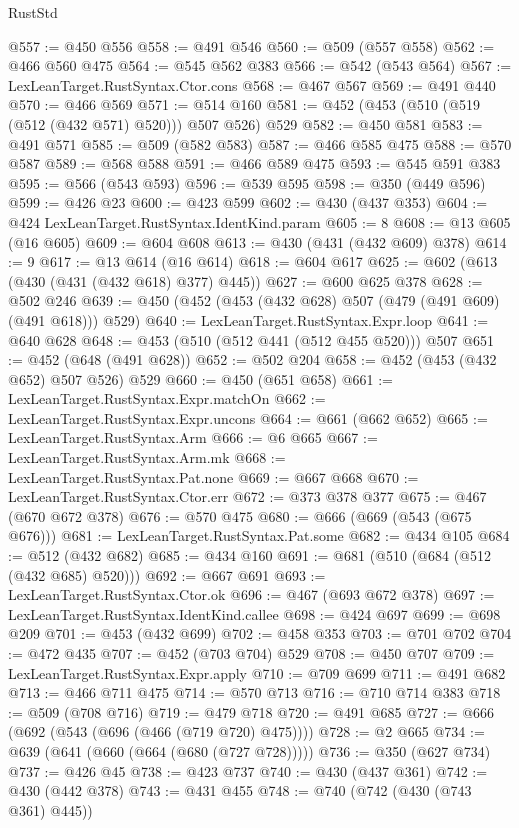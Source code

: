 \begin{lexlean}{RustStd}
\begin{coremodule}
@557 := @450 @556
@558 := @491 @546
@560 := @509 (@557 @558)
@562 := @466 @560 @475
@564 := @545 @562 @383
@566 := @542 (@543 @564)
@567 := LexLeanTarget.RustSyntax.Ctor.cons
@568 := @467 @567
@569 := @491 @440
@570 := @466 @569
@571 := @514 @160
@581 := @452 (@453 (@510 (@519 (@512 (@432 @571) @520))) @507 @526) @529
@582 := @450 @581
@583 := @491 @571
@585 := @509 (@582 @583)
@587 := @466 @585 @475
@588 := @570 @587
@589 := @568 @588
@591 := @466 @589 @475
@593 := @545 @591 @383
@595 := @566 (@543 @593)
@596 := @539 @595
@598 := @350 (@449 @596)
@599 := @426 @23
@600 := @423 @599
@602 := @430 (@437 @353)
@604 := @424 LexLeanTarget.RustSyntax.IdentKind.param
@605 := 8
@608 := @13 @605 (@16 @605)
@609 := @604 @608
@613 := @430 (@431 (@432 @609) @378)
@614 := 9
@617 := @13 @614 (@16 @614)
@618 := @604 @617
@625 := @602 (@613 (@430 (@431 (@432 @618) @377) @445))
@627 := @600 @625 @378
@628 := @502 @246
@639 := @450 (@452 (@453 (@432 @628) @507 (@479 (@491 @609) (@491 @618))) @529)
@640 := LexLeanTarget.RustSyntax.Expr.loop
@641 := @640 @628
@648 := @453 (@510 (@512 @441 (@512 @455 @520))) @507
@651 := @452 (@648 (@491 @628))
@652 := @502 @204
@658 := @452 (@453 (@432 @652) @507 @526) @529
@660 := @450 (@651 @658)
@661 := LexLeanTarget.RustSyntax.Expr.matchOn
@662 := LexLeanTarget.RustSyntax.Expr.uncons
@664 := @661 (@662 @652)
@665 := LexLeanTarget.RustSyntax.Arm
@666 := @6 @665
@667 := LexLeanTarget.RustSyntax.Arm.mk
@668 := LexLeanTarget.RustSyntax.Pat.none
@669 := @667 @668
@670 := LexLeanTarget.RustSyntax.Ctor.err
@672 := @373 @378 @377
@675 := @467 (@670 @672 @378)
@676 := @570 @475
@680 := @666 (@669 (@543 (@675 @676)))
@681 := LexLeanTarget.RustSyntax.Pat.some
@682 := @434 @105
@684 := @512 (@432 @682)
@685 := @434 @160
@691 := @681 (@510 (@684 (@512 (@432 @685) @520)))
@692 := @667 @691
@693 := LexLeanTarget.RustSyntax.Ctor.ok
@696 := @467 (@693 @672 @378)
@697 := LexLeanTarget.RustSyntax.IdentKind.callee
@698 := @424 @697
@699 := @698 @209
@701 := @453 (@432 @699)
@702 := @458 @353
@703 := @701 @702
@704 := @472 @435
@707 := @452 (@703 @704) @529
@708 := @450 @707
@709 := LexLeanTarget.RustSyntax.Expr.apply
@710 := @709 @699
@711 := @491 @682
@713 := @466 @711 @475
@714 := @570 @713
@716 := @710 @714 @383
@718 := @509 (@708 @716)
@719 := @479 @718
@720 := @491 @685
@727 := @666 (@692 (@543 (@696 (@466 (@719 @720) @475))))
@728 := @2 @665
@734 := @639 (@641 (@660 (@664 (@680 (@727 @728)))))
@736 := @350 (@627 @734)
@737 := @426 @45
@738 := @423 @737
@740 := @430 (@437 @361)
@742 := @430 (@442 @378)
@743 := @431 @455
@748 := @740 (@742 (@430 (@743 @361) @445))

\end{coremodule}
\end{lexlean}
